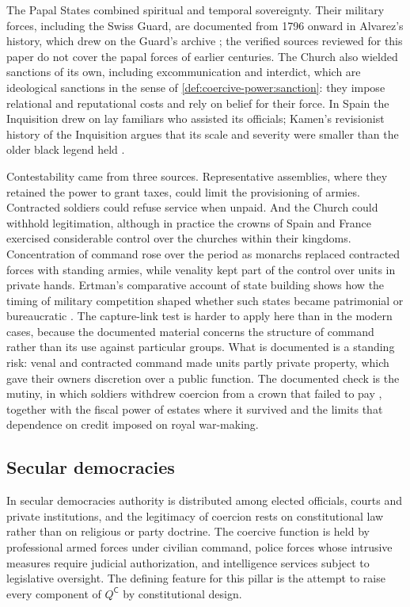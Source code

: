 \documentclass[11pt,letterpaper]{article}
\theoremstyle{definition}
\theoremstyle{remark}
\newcommand{\pC}{\mathsf{C}}
\begin{document}
The Papal States combined spiritual and temporal sovereignty. Their military forces, including the Swiss Guard, are documented from 1796 onward in Alvarez's history, which drew on the Guard's archive \citep{alvarez2011}; the verified sources reviewed for this paper do not cover the papal forces of earlier centuries. The Church also wielded sanctions of its own, including excommunication and interdict, which are ideological sanctions in the sense of \cref{def:coercive-power:sanction}: they impose relational and reputational costs and rely on belief for their force. In Spain the Inquisition drew on lay familiars who assisted its officials; Kamen's revisionist history of the Inquisition argues that its scale and severity were smaller than the older black legend held \citep{kamen1997}.

Contestability came from three sources. Representative assemblies, where they retained the power to grant taxes, could limit the provisioning of armies. Contracted soldiers could refuse service when unpaid. And the Church could withhold legitimation, although in practice the crowns of Spain and France exercised considerable control over the churches within their kingdoms. Concentration of command rose over the period as monarchs replaced contracted forces with standing armies, while venality kept part of the control over units in private hands. Ertman's comparative account of state building shows how the timing of military competition shaped whether such states became patrimonial or bureaucratic \citep{ertman1997}. The capture-link test is harder to apply here than in the modern cases, because the documented material concerns the structure of command rather than its use against particular groups. What is documented is a standing risk: venal and contracted command made units partly private property, which gave their owners discretion over a public function. The documented check is the mutiny, in which soldiers withdrew coercion from a crown that failed to pay \citep{parker1972}, together with the fiscal power of estates where it survived and the limits that dependence on credit imposed on royal war-making.

\subsection{Secular democracies}
\label{sec:secular}

In secular democracies authority is distributed among elected officials, courts and private institutions, and the legitimacy of coercion rests on constitutional law rather than on religious or party doctrine. The coercive function is held by professional armed forces under civilian command, police forces whose intrusive measures require judicial authorization, and intelligence services subject to legislative oversight. The defining feature for this pillar is the attempt to raise every component of $Q^{\pC}$ by constitutional design.
\end{document}
